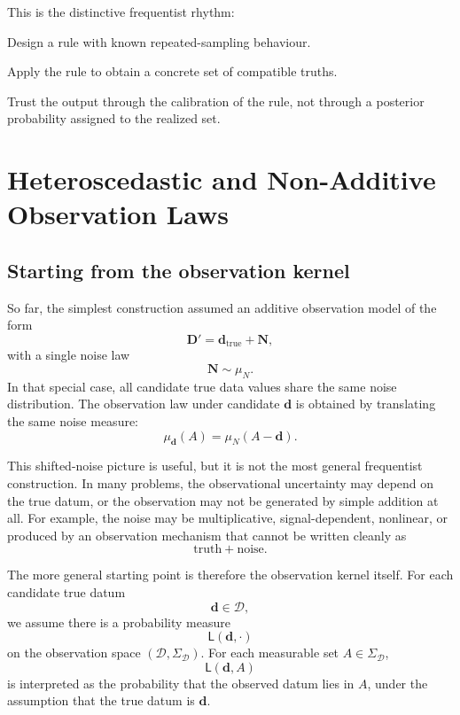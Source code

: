 \documentclass[11pt]{article}
\newcommand{\Dspace}{\mathcal D}
\newcommand{\SigmaD}{\Sigma_{\mathcal D}}
\newcommand{\muN}{\mu_N}
\newcommand{\Dobsrand}{\mathbf D'}
\newcommand{\Nrand}{\mathbf N}
\newcommand{\dtrue}{\mathbf d_{\mathrm{true}}}
\begin{document}
This is the distinctive frequentist rhythm:
\begin{description}[leftmargin=3.2cm,style=nextline]
    \item[Before seeing data.]
    Design a rule with known repeated-sampling behaviour.

    \item[After seeing data.]
    Apply the rule to obtain a concrete set of compatible truths.

    \item[Interpretation.]
    Trust the output through the calibration of the rule, not through a posterior probability assigned to the realized set.
\end{description}


\section{Heteroscedastic and Non-Additive Observation Laws}

\subsection{Starting from the observation kernel}

So far, the simplest construction assumed an additive observation model of the form
\[
    \Dobsrand=\dtrue+\Nrand,
\]
with a single noise law
\[
    \Nrand\sim\muN.
\]
In that special case, all candidate true data values share the same noise distribution. The observation law under candidate \(\mathbf d\) is obtained by translating the same noise measure:
\[
    \mu_{\mathbf d}(A)
    =
    \muN(A-\mathbf d).
\]

This shifted-noise picture is useful, but it is not the most general frequentist construction. In many problems, the observational uncertainty may depend on the true datum, or the observation may not be generated by simple addition at all. For example, the noise may be multiplicative, signal-dependent, nonlinear, or produced by an observation mechanism that cannot be written cleanly as
\[
    \text{truth}+\text{noise}.
\]

The more general starting point is therefore the observation kernel itself. For each candidate true datum
\[
    \mathbf d\in\Dspace,
\]
we assume there is a probability measure
\[
    \mathsf L(\mathbf d,\cdot)
\]
on the observation space \((\Dspace,\SigmaD)\). For each measurable set \(A\in\SigmaD\),
\[
    \mathsf L(\mathbf d,A)
\]
is interpreted as the probability that the observed datum lies in \(A\), under the assumption that the true datum is \(\mathbf d\).
\end{document}

